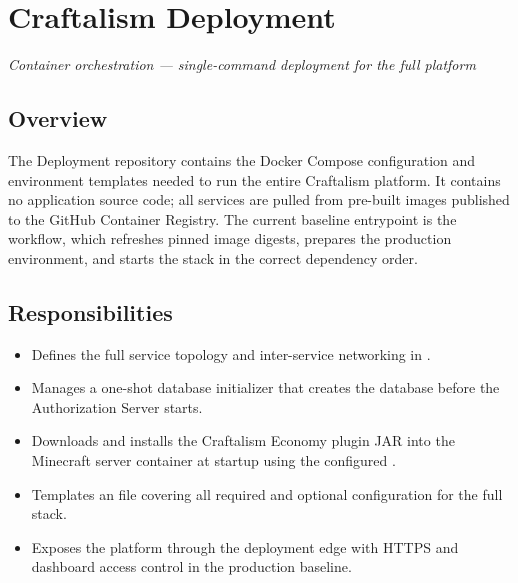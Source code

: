 

\chapter{Craftalism Deployment}
\label{ch:deployment}


\textcolor{CraftGray}{\textit{Container orchestration — single-command deployment for the full platform}}

\bigskip

\section{Overview}

The Deployment repository contains the Docker Compose configuration and environment templates needed to run the entire Craftalism platform. It contains no application source code; all services are pulled from pre-built images published to the GitHub Container Registry. The current baseline entrypoint is the  workflow, which refreshes pinned image digests, prepares the production environment, and starts the stack in the correct dependency order.

\section{Responsibilities}

\begin{itemize}
  \item Defines the full service topology and inter-service networking in .
  \item Manages a one-shot database initializer that creates the  database before the Authorization Server starts.
  \item Downloads and installs the Craftalism Economy plugin JAR into the Minecraft server container at startup using the configured .
  \item Templates an  file covering all required and optional configuration for the full stack.
  \item Exposes the platform through the deployment edge with HTTPS and dashboard access control in the production baseline.
\end{itemize}

